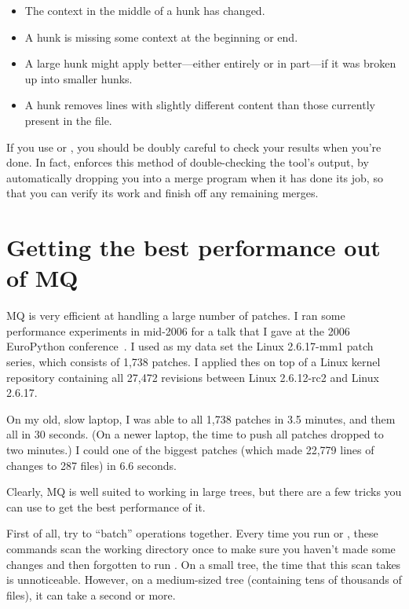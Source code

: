 \begin{itemize}
\item The context in the middle of a hunk has changed.
\item A hunk is missing some context at the beginning or end.
\item A large hunk might apply better---either entirely or in
  part---if it was broken up into smaller hunks.
\item A hunk removes lines with slightly different content than those
  currently present in the file.
\end{itemize}

If you use  or , you should be doubly
careful to check your results when you're done.  In fact,
 enforces this method of double-checking the tool's
output, by automatically dropping you into a merge program when it has
done its job, so that you can verify its work and finish off any
remaining merges.

\section{Getting the best performance out of MQ}
\label{sec:mq:perf}

MQ is very efficient at handling a large number of patches.  I ran
some performance experiments in mid-2006 for a talk that I gave at the
2006 EuroPython conference~\cite{web:europython}.  I used as my data
set the Linux 2.6.17-mm1 patch series, which consists of 1,738
patches.  I applied thes on top of a Linux kernel repository
containing all 27,472 revisions between Linux 2.6.12-rc2 and Linux
2.6.17.

On my old, slow laptop, I was able to
 all 1,738 patches in 3.5 minutes,
and  them all in 30 seconds.  (On a
newer laptop, the time to push all patches dropped to two minutes.)  I
could  one of the biggest patches (which made 22,779
lines of changes to 287 files) in 6.6 seconds.

Clearly, MQ is well suited to working in large trees, but there are a
few tricks you can use to get the best performance of it.

First of all, try to ``batch'' operations together.  Every time you
run  or , these commands scan the working
directory once to make sure you haven't made some changes and then
forgotten to run .  On a small tree, the time that
this scan takes is unnoticeable.  However, on a medium-sized tree
(containing tens of thousands of files), it can take a second or more.

